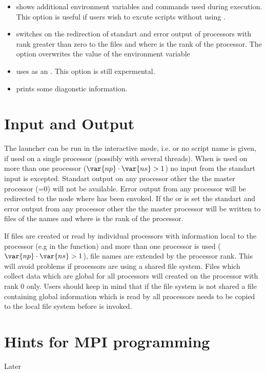 \begin{itemize}
 \item[\programopt{-e}] shows additional environment variables and commands used during   execution. This option is useful if users wish to excute scripts without using .

 \item[\programopt{-o}] switches on the redirection of standart and error output of processors with \MPI rank greater than zero to the files  and  where  is the rank of the processor. The option overwrites the value of the  environment variable 

 \item[\programopt{-x}] uses  as an \esysxml.  
This option is still expermental.

 \item[\programopt{-v}] prints some diagonstic information.
\end{itemize}

\section{Input and Output}
The  launcher can be run in the interactive mode, i.e.
 or no script name  is given, if used on a single processor (possibly with several threads). When \MPI is used on more than one processor ($\var{np} \cdot \var{ns} >1$) no input from the standart input is excepted. Standart output on any processor other the the master processor (=0) will not be available. Error output from any processor will be redirected to the node where  has been envoked. If the  or  is set the standart and error output from any processor other the the master processor will be written
to files of the names  and  where 
 is the rank of the processor.

If files are created or read by individual \MPI processors with information local to the processor (e.g in the  function)  and more than one processor is used ($\var{np} \cdot \var{ns} >1$), file names are extended by the \MPI processor rank. This will avoid problems if processors are using a shared file system. Files which collect data which are global for all \MPI processors will created on the processor with \MPI rank 0 only. Users should keep in mind that if the file system is not shared a file containing global information
which is read by all processors needs to be copied to the local file system before  is invoked.
 

\section{Hints for MPI programming}
Later